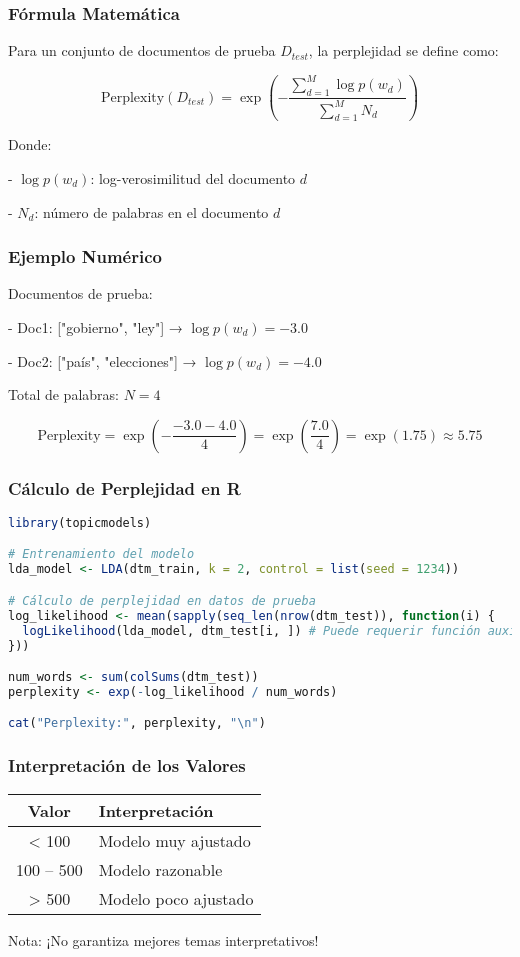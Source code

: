 \documentclass[10pt]{beamer}
\begin{document}
\begin{frame}
\frametitle{Fórmula Matemática}
Para un conjunto de documentos de prueba $ D_{test} $, la perplejidad se define como:

$$
\text{Perplexity}(D_{test}) = \exp\left( -\frac{\sum_{d=1}^{M} \log p(w_d)}{\sum_{d=1}^{M} N_d} \right)
$$

Donde:

    
- $ \log p(w_d) $: log-verosimilitud del documento $ d $
    
- $ N_d $: número de palabras en el documento $ d $

\end{frame}

\begin{frame}
\frametitle{Ejemplo Numérico}
Documentos de prueba:

    
- Doc1: ["gobierno", "ley"] → $ \log p(w_d) = -3.0 $
    
- Doc2: ["país", "elecciones"] → $ \log p(w_d) = -4.0 $


Total de palabras: $ N = 4 $

$$
\text{Perplexity} = \exp\left( -\frac{-3.0 -4.0}{4} \right) = \exp\left( \frac{7.0}{4} \right) = \exp(1.75) \approx 5.75
$$
\end{frame}

\begin{frame}[fragile]
\frametitle{Cálculo de Perplejidad en R}
\begin{lstlisting}[language=R]
library(topicmodels)

# Entrenamiento del modelo
lda_model <- LDA(dtm_train, k = 2, control = list(seed = 1234))

# Cálculo de perplejidad en datos de prueba
log_likelihood <- mean(sapply(seq_len(nrow(dtm_test)), function(i) {
  logLikelihood(lda_model, dtm_test[i, ]) # Puede requerir función auxiliar
}))

num_words <- sum(colSums(dtm_test))
perplexity <- exp(-log_likelihood / num_words)

cat("Perplexity:", perplexity, "\n")
\end{lstlisting}
\end{frame}

\begin{frame}
\frametitle{Interpretación de los Valores}
\begin{center}
\begin{tabular}{cl}
\toprule
Valor & Interpretación \\
\midrule
< 100     & Modelo muy ajustado \\
100 – 500 & Modelo razonable \\
> 500     & Modelo poco ajustado \\
\bottomrule
\end{tabular}
\end{center}

Nota: ¡No garantiza mejores temas interpretativos!
\end{frame}
\end{document}
